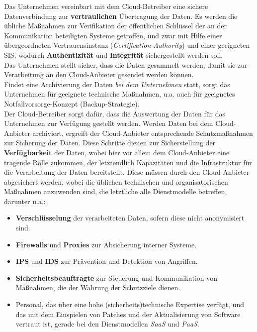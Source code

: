 \noindent
Das Unternehmen vereinbart mit dem Cloud-Betreiber eine sichere Datenverbindung zur \textbf{vertraulichen} Übertragung der Daten.
Es werden die übliche Maßnahmen zur Verifikation der öffentlichen Schlüssel der an der Kommunikation beteiligten Systeme getroffen, und zwar mit Hilfe einer übergeordneten Vertrauensinstanz (\textit{Certification Authority}) und einer geeigneten SIS, wodurch \textbf{Authentizität} und \textbf{Integrität} sichergestellt werden soll.\\

\noindent
Das Unternehmen stellt sicher, dass die Daten gesammelt werden, damit sie zur Verarbeitung an den Cloud-Anbieter gesendet werden können.\\
Findet eine Archivierung der Daten \textit{bei dem Unternehmen} statt, sorgt das Unternehmen für geeignete technische Maßnahmen, u.a. auch für geeignetes Notfallvorsorge-Konzept (Backup-Strategie).\\
Der Cloud-Betreiber sorgt dafür, dass die Auswertung der Daten für das Unternehmen zur Verfügung gestellt werden.
Werden Daten bei dem Cloud-Anbieter archiviert, ergreift der Cloud-Anbieter entsprechende Schutzmaßnahmen zur Sicherung der Daten.
Diese Schritte dienen zur Sicherstellung der \textbf{Verfügbarkeit} der Daten, wobei hier vor allem dem Cloud-Anbieter eine tragende Rolle zukommen, der letztendlich Kapazitäten und die Infrastruktur für die Verarbeitung der Daten bereitstellt.
Diese müssen durch den Cloud-Anbieter abgesichert werden, wobei die üblichen technischen und organisatorischen Maßnahmen anzuwenden sind, die letztliche alle Dienstmodelle betreffen, darunter u.a.:

\begin{itemize}
    \itemsep0.5em
    \item \textbf{Verschlüsselung} der verarbeiteten Daten, sofern diese nicht anonymisiert sind.
    \item \textbf{Firewalls} und \textbf{Proxies} zur Absicherung interner Systeme.
    \item \textbf{IPS} und \textbf{IDS} zur Prävention und Detektion von Angriffen.
    \item \textbf{Sicherheitsbeauftragte} zur Steuerung und Kommunikation von Maßnahmen, die der Wahrung der Schutzziele dienen.
    \item Personal, das über eine hohe (sicherheits)technische Expertise verfügt, und das mit dem Einspielen von Patches und der Aktualisierung von Software vertraut ist, gerade bei den Dienstmodellen \textit{SaaS} und \textit{PaaS}.
\end{itemize}

